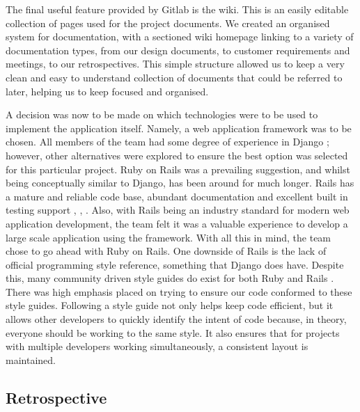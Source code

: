 \documentclass{l3proj}
\begin{document}
The final useful feature provided by Gitlab is the wiki. This is an easily editable collection of pages used for the project documents. We created an organised system for documentation, with a sectioned wiki homepage linking to a variety of documentation types, from our design documents, to customer requirements and meetings, to our retrospectives. This simple structure allowed us to keep a very clean and easy to understand collection of documents that could be referred to later, helping us to keep focused and organised.

A decision was now to be made on which technologies were to be used to implement the application itself. Namely, a web application framework was to be chosen. All members of the team had some degree of experience in Django \cite{Django}; however, other alternatives were explored to ensure the best option was selected for this particular project. Ruby on Rails was a prevailing suggestion, and whilst being conceptually similar to Django, has been around for much longer. Rails has a mature and reliable code base, abundant documentation and excellent built in testing support \cite{Testing}, \cite{Rails}, \cite{DjangoVsRails}. Also, with Rails being an industry standard for modern web application development, the team felt it was a valuable experience to develop a large scale application using the framework. With all this in mind, the team chose to go ahead with Ruby on Rails. One downside of Rails is the lack of official programming style reference, something that Django does have. Despite this, many community driven style guides do exist for both Ruby \cite{rubyStyle} and Rails \cite{railsStyle}. There was high emphasis placed on trying to ensure our code conformed to these style guides. Following a style guide not only helps keep code efficient, but it allows other developers to quickly identify the intent of code because, in theory, everyone should be working to the same style. It also ensures that for projects with multiple developers working simultaneously, a consistent layout is maintained. 

\subsection{Retrospective}
\label{retrospective}
\end{document}
